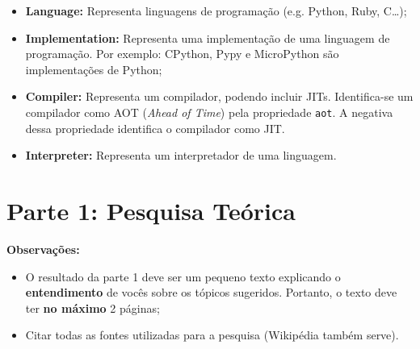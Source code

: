 \documentclass[answers]{exam}
\begin{document}
    \begin{itemize}
        \item \textbf{Language:} Representa linguagens de programação (e.g.
            Python, Ruby, C\ldots);
        \item \textbf{Implementation:} Representa uma implementação de uma
            linguagem de programação. Por exemplo: CPython, Pypy e MicroPython
            são implementações de Python;
        \item \textbf{Compiler:} Representa um compilador, podendo incluir
            JITs. Identifica-se um compilador como AOT (\textit{Ahead of Time})
            pela propriedade \texttt{aot}. A negativa dessa propriedade
            identifica o compilador como JIT\@.
        \item \textbf{Interpreter:} Representa um interpretador de uma
            linguagem.
    \end{itemize}

    \section{Parte 1: Pesquisa Teórica}

    \begin{superframe}
        \textbf{Observações:}

        \begin{itemize}
            \item O resultado da parte 1 deve ser um pequeno texto
                explicando o \textbf{entendimento} de vocês sobre os
                tópicos sugeridos. Portanto, o texto deve ter \textbf{no
                máximo} 2 páginas;
            \item Citar todas as fontes utilizadas para a pesquisa
                (Wikipédia também serve).
        \end{itemize}
    \end{superframe}
\end{document}
